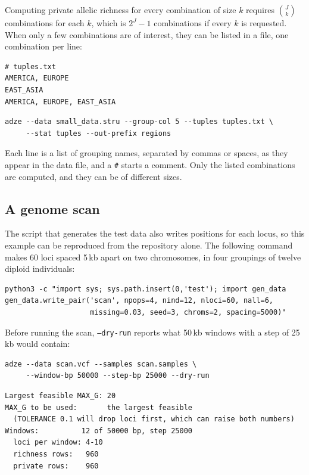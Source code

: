 \documentclass[11pt]{article}
\newcommand{\flag}[1]{\texttt{#1}}
\begin{document}
Computing private allelic richness for every combination of size $k$ requires
$\binom{J}{k}$ combinations for each $k$, which is $2^J - 1$ combinations if
every $k$ is requested. When only a few combinations are of interest, they can
be listed in a file, one combination per line:
\begin{Verbatim}[xleftmargin=1em]
# tuples.txt
AMERICA, EUROPE
EAST_ASIA
AMERICA, EUROPE, EAST_ASIA
\end{Verbatim}
\begin{Verbatim}[xleftmargin=1em]
adze --data small_data.stru --group-col 5 --tuples tuples.txt \
     --stat tuples --out-prefix regions
\end{Verbatim}
\noindent Each line is a list of grouping names, separated by commas or
spaces, as they appear in the data file, and a \texttt{\#} starts a comment.
Only the listed combinations are computed, and they can be of different
sizes.


\subsection{A genome scan}
\label{sec:scanexample}

The script that generates the test data also writes positions for each locus,
so this example can be reproduced from the repository alone. The following
command makes 60 loci spaced 5\,kb apart on two chromosomes, in four groupings
of twelve diploid individuals:

\begin{Verbatim}[frame=single,fontsize=\small]
python3 -c "import sys; sys.path.insert(0,'test'); import gen_data
gen_data.write_pair('scan', npops=4, nind=12, nloci=60, nall=6,
                    missing=0.03, seed=3, chroms=2, spacing=5000)"
\end{Verbatim}

\noindent Before running the scan, \flag{--dry-run} reports what 50\,kb windows
with a step of 25\,kb would contain:

\begin{Verbatim}[frame=single,fontsize=\small]
adze --data scan.vcf --samples scan.samples \
     --window-bp 50000 --step-bp 25000 --dry-run
\end{Verbatim}

\begin{Verbatim}[frame=single,fontsize=\small]
Largest feasible MAX_G: 20
MAX_G to be used:       the largest feasible
  (TOLERANCE 0.1 will drop loci first, which can raise both numbers)
Windows:          12 of 50000 bp, step 25000
  loci per window: 4-10
  richness rows:   960
  private rows:    960
\end{Verbatim}
\end{document}
